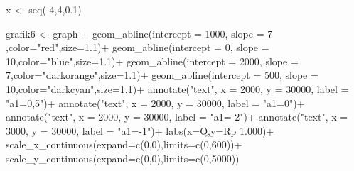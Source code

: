 \documentclass[
  letterpaper,
  DIV=11,
  numbers=noendperiod]{scrartcl}
\newenvironment{Shaded}{\begin{snugshade}}{\end{snugshade}}
\newcommand{\AttributeTok}[1]{\textcolor[rgb]{0.40,0.45,0.13}{#1}}
\newcommand{\DecValTok}[1]{\textcolor[rgb]{0.68,0.00,0.00}{#1}}
\newcommand{\FloatTok}[1]{\textcolor[rgb]{0.68,0.00,0.00}{#1}}
\newcommand{\FunctionTok}[1]{\textcolor[rgb]{0.28,0.35,0.67}{#1}}
\newcommand{\NormalTok}[1]{\textcolor[rgb]{0.00,0.23,0.31}{#1}}
\newcommand{\OtherTok}[1]{\textcolor[rgb]{0.00,0.23,0.31}{#1}}
\newcommand{\SpecialCharTok}[1]{\textcolor[rgb]{0.37,0.37,0.37}{#1}}
\newcommand{\StringTok}[1]{\textcolor[rgb]{0.13,0.47,0.30}{#1}}
\begin{document}
\begin{Shaded}
\begin{Highlighting}[]
\NormalTok{x }\OtherTok{\textless{}{-}} \FunctionTok{seq}\NormalTok{(}\SpecialCharTok{{-}}\DecValTok{4}\NormalTok{,}\DecValTok{4}\NormalTok{,}\FloatTok{0.1}\NormalTok{)}

\NormalTok{grafik6 }\OtherTok{\textless{}{-}}\NormalTok{ graph }\SpecialCharTok{+}
  \FunctionTok{geom\_abline}\NormalTok{(}\AttributeTok{intercept =} \DecValTok{1000}\NormalTok{, }\AttributeTok{slope =} \DecValTok{7}\NormalTok{ ,}\AttributeTok{color=}\StringTok{"red"}\NormalTok{,}\AttributeTok{size=}\FloatTok{1.1}\NormalTok{)}\SpecialCharTok{+}
  \FunctionTok{geom\_abline}\NormalTok{(}\AttributeTok{intercept =} \DecValTok{0}\NormalTok{, }\AttributeTok{slope =} \DecValTok{10}\NormalTok{,}\AttributeTok{color=}\StringTok{"blue"}\NormalTok{,}\AttributeTok{size=}\FloatTok{1.1}\NormalTok{)}\SpecialCharTok{+}
  \FunctionTok{geom\_abline}\NormalTok{(}\AttributeTok{intercept =} \DecValTok{2000}\NormalTok{, }\AttributeTok{slope =} \DecValTok{7}\NormalTok{,}\AttributeTok{color=}\StringTok{"darkorange"}\NormalTok{,}\AttributeTok{size=}\FloatTok{1.1}\NormalTok{)}\SpecialCharTok{+}
  \FunctionTok{geom\_abline}\NormalTok{(}\AttributeTok{intercept =} \DecValTok{500}\NormalTok{, }\AttributeTok{slope =} \DecValTok{10}\NormalTok{,}\AttributeTok{color=}\StringTok{"darkcyan"}\NormalTok{,}\AttributeTok{size=}\FloatTok{1.1}\NormalTok{)}\SpecialCharTok{+}
  \FunctionTok{annotate}\NormalTok{(}\StringTok{"text"}\NormalTok{, }\AttributeTok{x =} \DecValTok{2000}\NormalTok{, }\AttributeTok{y =} \DecValTok{30000}\NormalTok{, }\AttributeTok{label =} \StringTok{"a1=0,5"}\NormalTok{)}\SpecialCharTok{+}
  \FunctionTok{annotate}\NormalTok{(}\StringTok{"text"}\NormalTok{, }\AttributeTok{x =} \DecValTok{2000}\NormalTok{, }\AttributeTok{y =} \DecValTok{30000}\NormalTok{, }\AttributeTok{label =} \StringTok{"a1=0"}\NormalTok{)}\SpecialCharTok{+}
  \FunctionTok{annotate}\NormalTok{(}\StringTok{"text"}\NormalTok{, }\AttributeTok{x =} \DecValTok{2000}\NormalTok{, }\AttributeTok{y =} \DecValTok{30000}\NormalTok{, }\AttributeTok{label =} \StringTok{"a1={-}2"}\NormalTok{)}\SpecialCharTok{+}
  \FunctionTok{annotate}\NormalTok{(}\StringTok{"text"}\NormalTok{, }\AttributeTok{x =} \DecValTok{3000}\NormalTok{, }\AttributeTok{y =} \DecValTok{30000}\NormalTok{, }\AttributeTok{label =} \StringTok{"a1={-}1"}\NormalTok{)}\SpecialCharTok{+}
  \FunctionTok{labs}\NormalTok{(}\AttributeTok{x=}\StringTok{\textquotesingle{}Q\textquotesingle{}}\NormalTok{,}\AttributeTok{y=}\StringTok{\textquotesingle{}Rp 1.000\textquotesingle{}}\NormalTok{)}\SpecialCharTok{+}
  \FunctionTok{scale\_x\_continuous}\NormalTok{(}\AttributeTok{expand=}\FunctionTok{c}\NormalTok{(}\DecValTok{0}\NormalTok{,}\DecValTok{0}\NormalTok{),}\AttributeTok{limits=}\FunctionTok{c}\NormalTok{(}\DecValTok{0}\NormalTok{,}\DecValTok{600}\NormalTok{))}\SpecialCharTok{+}
  \FunctionTok{scale\_y\_continuous}\NormalTok{(}\AttributeTok{expand=}\FunctionTok{c}\NormalTok{(}\DecValTok{0}\NormalTok{,}\DecValTok{0}\NormalTok{),}\AttributeTok{limits=}\FunctionTok{c}\NormalTok{(}\DecValTok{0}\NormalTok{,}\DecValTok{5000}\NormalTok{))}


\end{Highlighting}
\end{Shaded}
\end{document}
